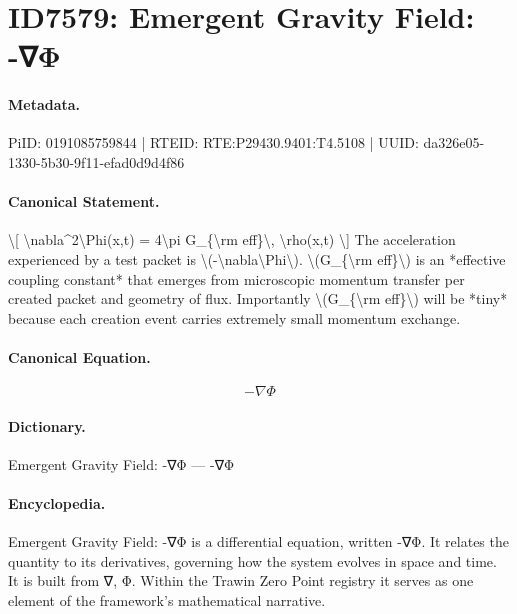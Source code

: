 \section*{ID7579: Emergent Gravity Field: -∇Φ}
\paragraph{Metadata.}
PiID: 0191085759844 | RTEID: RTE:P29430.9401:T4.5108 | UUID: da326e05-1330-5b30-9f11-efad0d9d4f86

\paragraph{Canonical Statement.}
\textbackslash{}[ \textbackslash{}nabla\textasciicircum{}2\textbackslash{}Phi(x,t) = 4\textbackslash{}pi G\_\{\textbackslash{}rm eff\}\textbackslash{}, \textbackslash{}rho(x,t) \textbackslash{}] The acceleration experienced by a test packet is \textbackslash{}(-\textbackslash{}nabla\textbackslash{}Phi\textbackslash{}). \textbackslash{}(G\_\{\textbackslash{}rm eff\}\textbackslash{}) is an *effective coupling constant* that emerges from microscopic momentum transfer per created packet and geometry of flux. Importantly \textbackslash{}(G\_\{\textbackslash{}rm eff\}\textbackslash{}) will be *tiny* because each creation event carries extremely small momentum exchange.

\paragraph{Canonical Equation.}
\[
-\nabla\Phi
\]

\paragraph{Dictionary.}
Emergent Gravity Field: -∇Φ — -∇Φ

\paragraph{Encyclopedia.}
Emergent Gravity Field: -∇Φ is a differential equation, written -∇Φ. It relates the quantity to its derivatives, governing how the system evolves in space and time. It is built from ∇, Φ. Within the Trawin Zero Point registry it serves as one element of the framework's mathematical narrative.
